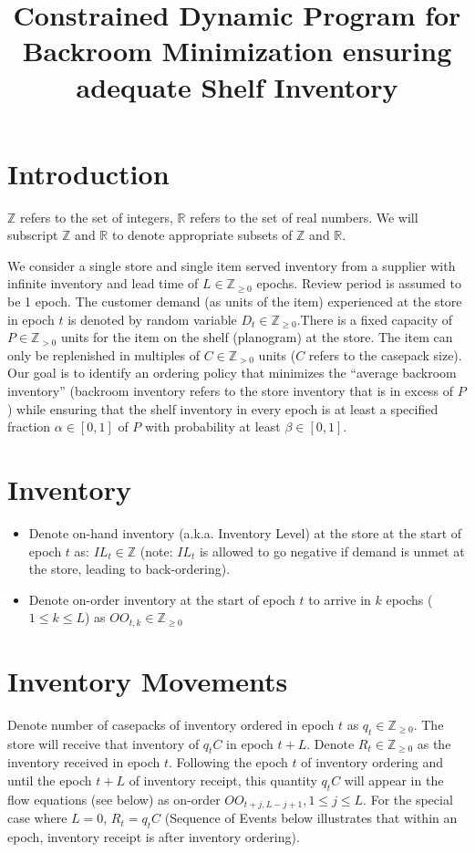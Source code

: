 \documentclass[12pt]{amsart}
\title{Constrained Dynamic Program for Backroom Minimization ensuring adequate Shelf Inventory}
\author{}
\date{} %
\begin{document}
\maketitle

\section{Introduction}

$\mathbb{Z}$ refers to the set of integers, $\mathbb{R}$ refers to the set of real numbers. We will subscript $\mathbb{Z}$ and $\mathbb{R}$ to denote appropriate subsets of $\mathbb{Z}$ and $\mathbb{R}$. 
 
We consider a single store and single item served inventory from a supplier with infinite inventory and lead time of $L \in \mathbb{Z}_{\geq 0}$ epochs. Review period is assumed to be 1 epoch. The  customer demand (as units of the item) experienced at the store in epoch $t$ is denoted by random variable $D_t \in \mathbb{Z}_{\geq 0}$.There is a fixed capacity of $P \in \mathbb{Z}_{> 0}$ units for the item on the shelf (planogram) at the store. The item can only be replenished in multiples of $C \in \mathbb{Z}_{> 0}$ units ($C$ refers to the casepack size). Our goal is to identify an ordering policy that minimizes the ``average backroom inventory'' (backroom inventory refers to the store inventory that is in excess of $P$) while ensuring that the shelf inventory in every epoch is at least a specified fraction $\alpha \in [0,1]$ of $P$ with probability at least $\beta \in [0,1]$.

\section{Inventory}
\begin{itemize}
\item Denote on-hand inventory (a.k.a. Inventory Level) at the store at the start of epoch $t$ as: $IL_t \in \mathbb{Z}$ (note: $IL_t$ is allowed to go negative if demand is unmet at the store, leading to back-ordering).
\item Denote on-order inventory at the start of epoch $t$ to arrive in $k$ epochs ($1 \leq k \leq L$)  as $OO_{t,k} \in \mathbb{Z}_{\geq 0}$
\end{itemize}

\section{Inventory Movements}
Denote number of casepacks of inventory ordered in epoch $t$ as $q_t \in \mathbb{Z}_{\geq 0}$. The store will receive that inventory of $q_t  C$ in epoch $t + L$. Denote $R_t \in \mathbb{Z}_{\geq 0}$ as the inventory received in epoch $t$. Following the epoch $t$ of inventory ordering and until the epoch $t+L$ of inventory receipt, this quantity $q_t C$ will appear in the flow equations (see below) as on-order $OO_{t+j,L-j+1}, 1 \leq j \leq L$. For the special case where $L = 0$, $R_t = q_t C$ (Sequence of Events below illustrates that within an epoch, inventory receipt is after inventory ordering).
\end{document}
